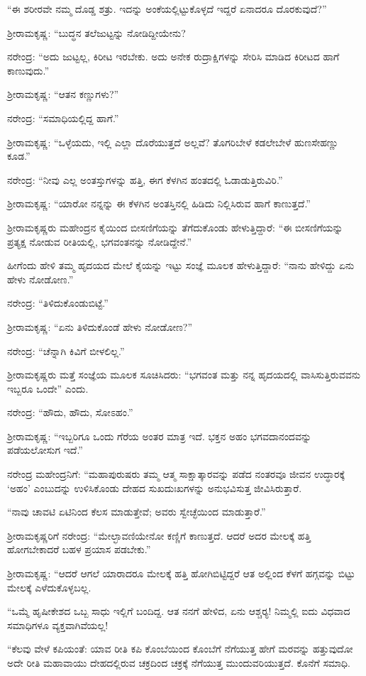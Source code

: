 “ಈ ಶರೀರವೇ ನಮ್ಮ ದೊಡ್ಡ ಶತ್ರು. ಇದನ್ನು ಅಂಕೆಯಲ್ಲಿಟ್ಟುಕೊಳ್ಳದೆ ಇದ್ದರೆ ಏನಾದರೂ ದೊರಕುವುದೆ?”

ಶ‍್ರೀರಾಮಕೃಷ್ಣ: “ಬುದ್ಧನ ತಲೆಜುಟ್ಟನ್ನು ನೋಡಿದ್ದೀಯೇನು?

ನರೇಂದ್ರ: “ಅದು ಜುಟ್ಟಲ್ಲ, ಕಿರೀಟ ಇರಬೇಕು. ಅದು ಅನೇಕ ರುದ್ರಾಕ್ಷಿಗಳನ್ನು ಸೇರಿಸಿ ಮಾಡಿದ ಕಿರೀಟದ ಹಾಗೆ ಕಾಣುವುದು.”

ಶ‍್ರೀರಾಮಕೃಷ್ಣ: “ಆತನ ಕಣ್ಣುಗಳು?”

ನರೇಂದ್ರ: “ಸಮಾಧಿಯಲ್ಲಿದ್ದ ಹಾಗೆ.”

ಶ‍್ರೀರಾಮಕೃಷ್ಣ: “ಒಳ್ಳೆಯದು, ಇಲ್ಲಿ ಎಲ್ಲಾ ದೊರೆಯುತ್ತದೆ ಅಲ್ಲವೆ? ತೊಗರಿಬೇಳೆ ಕಡಲೇಬೇಳೆ ಹುಣಸೇಹಣ್ಣು ಕೂಡ.”

ನರೇಂದ್ರ: “ನೀವು ಎಲ್ಲ ಅಂತಸ್ತುಗಳನ್ನು ಹತ್ತಿ, ಈಗ ಕೆಳಗಿನ ಹಂತದಲ್ಲಿ ಓಡಾಡುತ್ತಿರುವಿರಿ.”

ಶ‍್ರೀರಾಮಕೃಷ್ಣ: “ಯಾರೋ ನನ್ನನ್ನು ಈ ಕೆಳಗಿನ ಅಂತಸ್ತಿನಲ್ಲಿ ಹಿಡಿದು ನಿಲ್ಲಿಸಿರುವ ಹಾಗೆ ಕಾಣುತ್ತದೆ.”

ಶ‍್ರೀರಾಮಕೃಷ್ಣರು ಮಹೇಂದ್ರನ ಕೈಯಿಂದ ಬೀಸಣಿಗೆಯನ್ನು ತೆಗೆದುಕೊಂಡು ಹೇಳುತ್ತಿದ್ದಾರೆ: “ಈ ಬೀಸಣಿಗೆಯನ್ನು ಪ್ರತ್ಯಕ್ಷ ನೋಡುವ ರೀತಿಯಲ್ಲಿ, ಭಗವಂತನನ್ನು ನೋಡಿದ್ದೇನೆ.”

ಹೀಗೆಂದು ಹೇಳಿ ತಮ್ಮ ಹೃದಯದ ಮೇಲೆ ಕೈಯನ್ನು ಇಟ್ಟು ಸಂಜ್ಞೆ ಮೂಲಕ ಹೇಳುತ್ತಿದ್ದಾರೆ: “ನಾನು ಹೇಳಿದ್ದು ಏನು ಹೇಳು ನೋಡೋಣ.”

ನರೇಂದ್ರ: “ತಿಳಿದುಕೊಂಡುಬಿಟ್ಟೆ.”

ಶ‍್ರೀರಾಮಕೃಷ್ಣ: “ಏನು ತಿಳಿದುಕೊಂಡೆ ಹೇಳು ನೋಡೋಣ?”

ನರೇಂದ್ರ: “ಚೆನ್ನಾಗಿ ಕಿವಿಗೆ ಬೀಳಲಿಲ್ಲ.”

ಶ‍್ರೀರಾಮಕೃಷ್ಣರು ಮತ್ತೆ ಸಂಜ್ಞೆಯ ಮೂಲಕ ಸೂಚಿಸಿದರು: “ಭಗವಂತ ಮತ್ತು ನನ್ನ ಹೃದಯದಲ್ಲಿ ವಾಸಿಸುತ್ತಿರುವವನು ಇಬ್ಬರೂ ಒಂದೇ” ಎಂದು.

ನರೇಂದ್ರ: “ಹೌದು, ಹೌದು, ಸೋಽಹಂ.”

ಶ‍್ರೀರಾಮಕೃಷ್ಣ: “ಇಬ್ಬರಿಗೂ ಒಂದು ಗೆರೆಯ ಅಂತರ ಮಾತ್ರ ಇದೆ. ಭಕ್ತನ ಅಹಂ ಭಗವದಾನಂದವನ್ನು ಪಡೆಯಲೋಸುಗ ಇದೆ.”

ನರೇಂದ್ರ ಮಹೇಂದ್ರನಿಗೆ: “ಮಹಾಪುರುಷರು ತಮ್ಮ ಆತ್ಮ ಸಾಕ್ಷಾತ್ಕಾರವನ್ನು ಪಡೆದ ನಂತರವೂ ಜೀವನ ಉದ್ಧಾರಕ್ಕೆ ‘ಅಹಂ’ ಎಂಬುದನ್ನು ಉಳಿಸಿಕೊಂಡು ದೇಹದ ಸುಖದುಃಖಗಳನ್ನು ಅನುಭವಿಸುತ್ತ ಜೀವಿಸಿರುತ್ತಾರೆ.

“ನಾವು ಚಾವಟಿ ಏಟಿನಿಂದ ಕೆಲಸ ಮಾಡುತ್ತೇವೆ; ಅವರು ಸ್ವೇಚ್ಛೆಯಿಂದ ಮಾಡುತ್ತಾರೆ.”

ಶ‍್ರೀರಾಮಕೃಷ್ಣರಿಗೆ ನರೇಂದ್ರ: “ಮೇಲ್ಛಾವಣಿಯೇನೋ ಕಣ್ಣಿಗೆ ಕಾಣುತ್ತದೆ. ಆದರೆ ಅದರ ಮೇಲಕ್ಕೆ ಹತ್ತಿ ಹೋಗಬೇಕಾದರೆ ಬಹಳ ಪ್ರಯಾಸ ಪಡಬೇಕು.”

ಶ‍್ರೀರಾಮಕೃಷ್ಣ: “ಆದರೆ ಆಗಲೆ ಯಾರಾದರೂ ಮೇಲಕ್ಕೆ ಹತ್ತಿ ಹೋಗಿಬಿಟ್ಟಿದ್ದರೆ ಆತ ಅಲ್ಲಿಂದ ಕೆಳಗೆ ಹಗ್ಗವನ್ನು ಬಿಟ್ಟು ಮೇಲಕ್ಕೆ ಎಳೆದುಕೊಳ್ಳಬಲ್ಲ.

“ಒಮ್ಮೆ ಹೃಷೀಕೇಶದ ಒಬ್ಬ ಸಾಧು ಇಲ್ಲಿಗೆ ಬಂದಿದ್ದ. ಆತ ನನಗೆ ಹೇಳಿದ, ಏನು ಆಶ್ಚರ‍್ಯ! ನಿಮ್ಮಲ್ಲಿ ಐದು ವಿಧವಾದ ಸಮಾಧಿಗಳೂ ವ್ಯಕ್ತವಾಗಿವೆಯಲ್ಲ!

“ಕೆಲವು ವೇಳೆ ಕಪಿಯಂತೆ: ಯಾವ ರೀತಿ ಕಪಿ ಕೊಂಬೆಯಿಂದ ಕೊಂಬೆಗೆ ನೆಗೆಯುತ್ತ ಹೇಗೆ ಮರವನ್ನು ಹತ್ತುವುದೋ ಅದೇ ರೀತಿ ಮಹಾವಾಯು ದೇಹದಲ್ಲಿರುವ ಚಕ್ರದಿಂದ ಚಕ್ರಕ್ಕೆ ನೆಗೆಯುತ್ತ ಮುಂದುವರಿಯುತ್ತದೆ. ಕೊನೆಗೆ ಸಮಾಧಿ.

